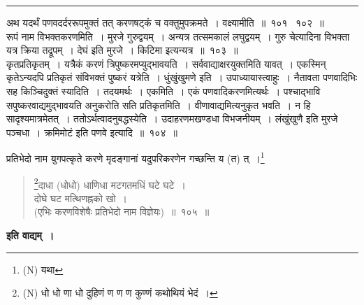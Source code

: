\documentclass[11pt, openany]{book}
\begin{document}
\hrule

\vspace{2mm}
अथ यदर्थं पणवदर्दररूपमुक्तं तत् करणषट्कं च वक्तुमुपक्रमते~। {\qtt वक्ष्यामीति}~॥~१०१ \textendash\ १०२~॥\\

रूपं नाम विभक्तकरणमिति~। मुरजे गुरुद्वयम्~। अन्यत्र तत्समकालं लघुद्वयम्~। गुरु चेत्यादिना विभक्ता यत्र क्रिया तद्रूपम्~। देघं इति मुरजे~। किटिमा इत्यन्यत्र~॥~१०३~॥\\

{\qtt कृतप्रतिकृतम्}~। यत्रैकं करणं त्रिपुष्करमप्युद्भावयति~। सर्ववाद्याक्षरयुक्तमिति यावत्~। एकस्मिन् कृतेऽन्यदपि प्रतिकृतं संविभक्तं पुष्करं यत्रेति~। धुंखुंखुमणे इति~। {\qtt उपाध्यायास्त्वाहुः}~। नैतावता पणवादिभिः सह किञ्चिदुक्तं स्यादिति~। तदयमर्थः~। एकमिति~। एकं पणवादिकरणमित्यर्थः~। पश्चाद्भावि सपुष्करवाद्यमुद्भावयति अनुकरोति सति प्रतिकृतमिति~। वीणावाद्यमित्यनुकृत भवति~। न हि सादृश्यमात्रमेतत्~। ततोऽर्थत्वादनुबद्धस्येति~। उदाहरणमखण्डधा विभजनीयम्~। लंखुंखुणै इति मुरजे पञ्चधा~। क्रमिमोटं इति पणवे इत्यादि~॥~१०४~॥

\newpage

{\qt प्रतिभेदो नाम युगपत्कृते करणे मृदङ्गानां यदुपरिकरणेन गच्छन्ति य (त) त्~।\renewcommand{\thefootnote}{1}\footnote{(N) यथा}}

\begin{quote}
{\na \renewcommand{\thefootnote}{2}\footnote{(N) धो धो णा धो दुहिणं ण ण ण कुण्णं कथोथियं भेदं~।}दाधा (धोधो) धाणिधा मटगतमधिं घटे घटे~।\\
दोघे घट मत्थिणह्नको खो~।\\
(एभिः करणविशेषैः प्रतिभेदो नाम विज्ञेयः)~॥~१०५~॥}
\end{quote}

\begin{center}
\textbf{इति वाद्यम्~।}
\end{center}
\end{document}
